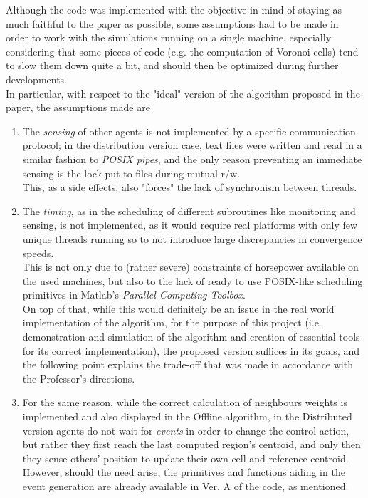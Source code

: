 \documentclass[a4paper,11pt,oneside]{book}
\begin{document}
	Although the code was implemented with the objective in mind of staying as much faithful to the paper as possible, some assumptions had to be made in order to work with the simulations running on a single machine, especially considering that some pieces of code (e.g. the computation of Voronoi cells) tend to slow them down quite a bit, and should then be optimized during further developments.\\ %
	
	In particular, with respect to the "ideal" version of the algorithm proposed in the paper\cite{K1}, the assumptions made are
	
	\begin{enumerate}
		\item The \textit{sensing} of other agents is not implemented by a specific communication protocol; in the distribution version case, text files were written and read in a similar fashion to \textit{POSIX pipes}, and the only reason preventing an immediate sensing is the lock put to files during mutual r/w.\\This, as a side effects, also "forces" the lack of synchronism between threads.
		
		\item The \textit{timing}, as in the scheduling of different subroutines like monitoring and sensing, is not implemented, as it would require real platforms with only few unique threads running so to not introduce large discrepancies in convergence speeds.\\
		This is not only due to (rather severe) constraints of horsepower available on the used machines, but also to the lack of ready to use POSIX-like scheduling primitives in Matlab's \textit{Parallel Computing Toolbox}.\\
		On top of that, while this would definitely be an issue in the real world implementation of the algorithm, for the purpose of this project (i.e. demonstration and simulation of the algorithm and creation of essential tools for its correct implementation), the proposed version suffices in its goals, and the following point explains the trade-off that was made in accordance with the Professor's directions.
		
		\item For the same reason, while the correct calculation of neighbours weights is implemented and also displayed in the Offline algorithm, in the Distributed version agents do not wait for \textit{events} in order to change the control action, but rather they first reach the last computed region's centroid, and only then they sense others' position to update their own cell and reference centroid.\\
		However, should the need arise, the primitives and functions aiding in the event generation are already available in Ver. A of the code, as mentioned.
		
		
	\end{enumerate}
	
\end{document}
